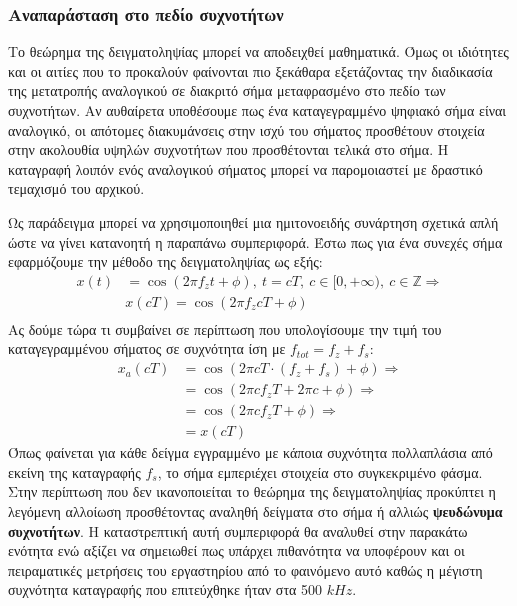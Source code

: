\documentclass[breaklines=true, 12pt]{article}
\begin{document}
\subsubsection{Αναπαράσταση στο πεδίο συχνοτήτων}
\label{sec:orgd3b1f1b}
Το θεώρημα της δειγματοληψίας μπορεί να αποδειχθεί μαθηματικά. Όμως
οι ιδιότητες και οι αιτίες που το προκαλούν φαίνονται πιο ξεκάθαρα
εξετάζοντας την διαδικασία της μετατροπής αναλογικού σε διακριτό σήμα
μεταφρασμένο στο πεδίο των συχνοτήτων. Αν αυθαίρετα υποθέσουμε πως ένα
καταγεγραμμένο ψηφιακό σήμα είναι αναλογικό, οι απότομες διακυμάνσεις
στην ισχύ του σήματος προσθέτουν στοιχεία στην ακολουθία υψηλών
συχνοτήτων που προσθέτονται τελικά στο σήμα. Η καταγραφή λοιπόν ενός
αναλογικού σήματος μπορεί να παρομοιαστεί με δραστικό τεμαχισμό του
αρχικού.

Ως παράδειγμα μπορεί να χρησιμοποιηθεί μια ημιτονοειδής συνάρτηση
σχετικά απλή ώστε να γίνει κατανοητή η παραπάνω συμπεριφορά. Έστω
πως για ένα συνεχές σήμα εφαρμόζουμε την μέθοδο της δειγματοληψίας
ως εξής:
\begin{equation}
\begin{align}
x(t)&=\cos(2 \pi f_{z}t + \phi),\ t=cT,\ c \in [0, +\infty),\ c \in \mathbb{Z} \Rightarrow \\
&x(cT) = \cos(2 \pi f_{z} cT + \phi) \\
\end{align}
\end{equation}
Ας δούμε τώρα τι συμβαίνει σε περίπτωση που υπολογίσουμε την τιμή
του καταγεγραμμένου σήματος σε συχνότητα ίση με \(f_{tot} = f_{z}+f_{s}\):
\begin{equation}
\begin{align}
x_{a}(cT) &= \cos(2 \pi cT \cdot (f_{z}+f_{s})+ \phi) \Rightarrow \\
&= \cos(2 \pi cf_{z}T + 2 \pi c + \phi) \Rightarrow \\
&= \cos(2 \pi cf_{z}T + \phi) \Rightarrow \\
&= x(cT)
\end{align}
\end{equation}
Όπως φαίνεται για κάθε δείγμα εγγραμμένο με κάποια συχνότητα
πολλαπλάσια από εκείνη της καταγραφής \(f_{s}\), το σήμα εμπεριέχει στοιχεία
στο συγκεκριμένο φάσμα. Στην περίπτωση που δεν ικανοποιείται το θεώρημα
της δειγματοληψίας προκύπτει η λεγόμενη αλλοίωση προσθέτοντας αναληθή
δείγματα στο σήμα ή αλλιώς \textbf{ψευδώνυμα συχνοτήτων}. Η καταστρεπτική αυτή
συμπεριφορά θα αναλυθεί στην παρακάτω ενότητα ενώ αξίζει να σημειωθεί
πως υπάρχει πιθανότητα να υποφέρουν και οι πειραματικές μετρήσεις του
εργαστηρίου από το φαινόμενο αυτό καθώς η μέγιστη συχνότητα καταγραφής
που επιτεύχθηκε ήταν στα 500 \(kHz\).
\end{document}
